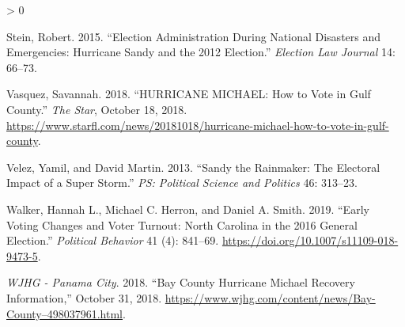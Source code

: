 \documentclass[
  12pt,
]{article}
\newlength{\cslhangindent}
\newenvironment{CSLReferences}[2] %
 {%
  \setlength{\parindent}{0pt}
  \ifodd #1 \everypar{\setlength{\hangindent}{\cslhangindent}}\ignorespaces\fi
  \ifnum #2 > 0
  \setlength{\parskip}{#2\baselineskip}
  \fi
 }%
 {}
\begin{document}
\begin{CSLReferences}{1}{0}
\leavevmode\hypertarget{ref-Stein2015}{}%
Stein, Robert. 2015. {``Election {Administration During National Disasters} and {Emergencies}: {Hurricane Sandy} and the 2012 {Election}.''} \emph{Election Law Journal} 14: 66--73.

\leavevmode\hypertarget{ref-Vasquez2018}{}%
Vasquez, Savannah. 2018. {``{HURRICANE MICHAEL}: {How} to Vote in {Gulf County}.''} \emph{The Star}, October 18, 2018. \url{https://www.starfl.com/news/20181018/hurricane-michael-how-to-vote-in-gulf-county}.

\leavevmode\hypertarget{ref-Velez2013}{}%
Velez, Yamil, and David Martin. 2013. {``Sandy the {Rainmaker}: {The Electoral Impact} of a {Super Storm}.''} \emph{PS: Political Science and Politics} 46: 313--23.

\leavevmode\hypertarget{ref-Walker2019}{}%
Walker, Hannah L., Michael C. Herron, and Daniel A. Smith. 2019. {``Early {Voting Changes} and {Voter Turnout}: {North Carolina} in the 2016 {General Election}.''} \emph{Political Behavior} 41 (4): 841--69. \url{https://doi.org/10.1007/s11109-018-9473-5}.

\leavevmode\hypertarget{ref-WJHG2018}{}%
\emph{WJHG - Panama City}. 2018. {``Bay {County Hurricane Michael Recovery Information},''} October 31, 2018. \url{https://www.wjhg.com/content/news/Bay-County–498037961.html}.

\end{CSLReferences}
\end{document}
